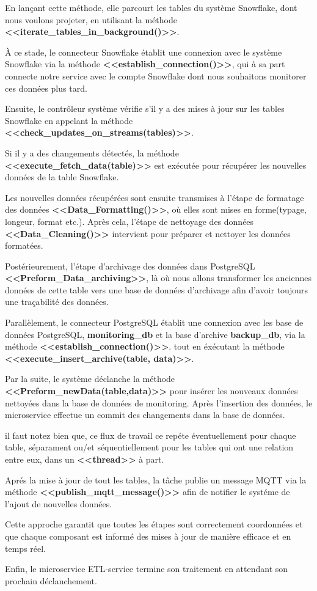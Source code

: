 En lançant cette méthode, elle parcourt les tables du système Snowflake, dont nous voulons projeter, en utilisant la méthode \textbf{<<iterate\_tables\_in\_background()>>}.
\par À ce stade, le connecteur Snowflake établit une connexion avec le système Snowflake via la méthode \textbf{<<establish\_connection()>>}, 
qui à sa part connecte notre service avec le compte Snowflake dont nous souhaitons monitorer ces données plus tard.
\par Ensuite, le contrôleur système vérifie s'il y a des mises à jour sur les tables Snowflake en appelant la méthode \textbf{<<check\_updates\_on\_streams(tables)>>}. 
\par Si il y a des changements détectés, la méthode \textbf{<<execute\_fetch\_data(table)>>} est exécutée pour récupérer les nouvelles données de la table Snowflake.
\par Les nouvelles données récupérées sont ensuite transmises à l'étape de formatage des données \newline \textbf{<<Data\_Formatting()>>}, où elles sont mises en forme(typage, longeur, format etc.). 
Après cela, l'étape de nettoyage des données \textbf{<<Data\_Cleaning()>>} intervient pour préparer et nettoyer les données formatées. 
\par Postérieurement, l'étape d'archivage des données dans PostgreSQL \textbf{<<Preform\_Data\_archiving>>}, là où nous allons transformer les anciennes données de cette table vers une base de données d'archivage afin d'avoir toujours une traçabilité des données. 
\par Parallèlement, le connecteur PostgreSQL établit une connexion avec les base de données PostgreSQL, \textbf{monitoring\_db} et la base d'archive \textbf{backup\_db}, via la méthode \textbf{<<establish\_connection()>>}. 
tout en éxécutant la méthode \textbf{<<execute\_insert\_archive(table, data)>>}. 
\par Par la suite, le système déclanche la méthode \textbf{<<Preform\_newData(table,data)>>} pour insérer les nouveaux données nettoyées dans la base de données de monitoring. 
Après l'insertion des données, le microservice effectue un commit des changements dans la base de données.
\par il faut notez bien que, ce flux de travail ce repéte éventuellement pour chaque table, séparament ou/et séquentiellement pour les tables qui ont une relation entre eux, dans un \textbf{<<thread>>} à part.
\par Aprés la mise à jour de tout les tables, la tâche publie un message MQTT via la méthode \newline \textbf{<<publish\_mqtt\_message()>>} afin de notifier le systéme de l'ajout de nouvelles données. 
\par Cette approche garantit que toutes les étapes sont correctement coordonnées et que chaque composant est informé des mises à jour de manière efficace et en temps réel.
\par Enfin, le microservice ETL-service termine son traitement en attendant son prochain déclanchement.
